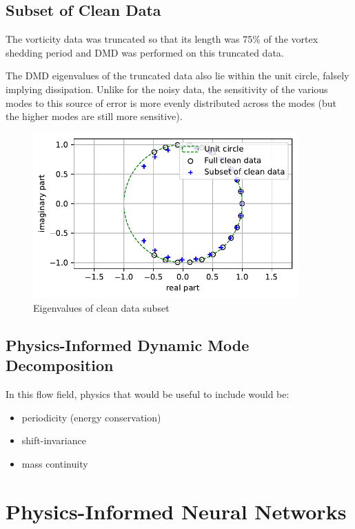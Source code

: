 \documentclass[11pt]{article}
\begin{document}
\subsection{Subset of Clean Data} %

The vorticity data was truncated so that its length was 75\% of the vortex shedding period and DMD was performed on this truncated data.

The DMD eigenvalues of the truncated data also lie within the unit circle, falsely implying dissipation. Unlike for the noisy data, the sensitivity of the various modes to this source of error is more evenly distributed across the modes (but the higher modes are still more sensitive).

\begin{figure}[H]
    \centering
    \includegraphics[width=4in]{fig1c_eigs.pdf}
    \caption{Eigenvalues of clean data subset}
    \label{fig1c1}
\end{figure}


\subsection*{Physics-Informed Dynamic Mode Decomposition}

In this flow field, physics that would be useful to include would be:
\begin{itemize}
    \item periodicity (energy conservation)
    \item shift-invariance
    \item mass continuity
\end{itemize}


\section{Physics-Informed Neural Networks}
\end{document}

